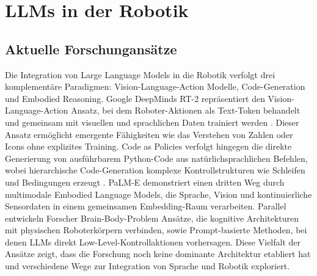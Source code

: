 \section{LLMs in der Robotik} \subsection{Aktuelle
	Forschungansätze} Die Integration von Large Language Models in die Robotik
verfolgt drei komplementäre Paradigmen: Vision-Language-Action Modelle,
Code-Generation und Embodied Reasoning. Google DeepMinds RT-2 repräsentiert den
Vision-Language-Action Ansatz, bei dem Roboter-Aktionen als Text-Token behandelt
und gemeinsam mit visuellen und sprachlichen Daten trainiert werden . Dieser Ansatz ermöglicht emergente Fähigkeiten wie das Verstehen von
Zahlen oder Icons ohne explizites Training. Code as Policies verfolgt hingegen
die direkte Generierung von ausführbarem Python-Code aus natürlichsprachlichen
Befehlen, wobei hierarchische Code-Generation komplexe Kontrollstrukturen wie
Schleifen und Bedingungen erzeugt . PaLM-E demonstriert
einen dritten Weg durch multimodale Embodied Language Models, die Sprache,
Vision und kontinuierliche Sensordaten in einem gemeinsamen Embedding-Raum
verarbeiten. Parallel entwickeln Forscher Brain-Body-Problem Ansätze, die
kognitive Architekturen mit physischen Roboterkörpern verbinden, sowie
Prompt-basierte Methoden, bei denen LLMs direkt Low-Level-Kontrollaktionen
vorhersagen. Diese Vielfalt der Ansätze zeigt, dass die Forschung noch keine
dominante Architektur etabliert hat und verschiedene Wege zur Integration von
Sprache und Robotik exploriert.

